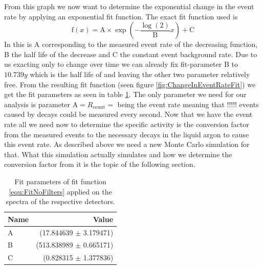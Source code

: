 \documentclass[encoding=utf8,british]{tumphthesis}
\begin{document}
From this graph we now want to determine the exponential change in the event rate by applying an exponential fit function.
The exact fit function used is
\begin{equation}
\mathrm{f}(x) = \mathrm{A}\times\exp\left(-\frac{\log(2)}{\mathrm{B}} x \right) + \mathrm{C}
\label{equ:FitFilters}
\end{equation}
In this is A corresponding to the measured \Kr event rate of the decreasing function, B the half life of the decrease and C the constant event background rate.
Due to us exacting only \Kr to change over time we can already fix fit-parameter B to \(10.739\unit{y}\) which is the half life of \Kr and leaving the other two parameter relatively free.
From the resulting fit function (seen figure \ref{fig:ChangeInEventRateFit}) we get the fit parameters as seen in table \ref{tab:FitParZeit}.
The only parameter we need for our analysis is parameter \(\mathrm{A} = R_{\mathrm{count}} = \) being the \Kr event rate meaning that !!!!! events caused by \Kr decays could be measured every second.
Now that we have the \Kr event rate all we need now to determine the specific activity is the conversion factor from the measured events to the necessary \Kr decays in the liquid argon to cause this \Kr event rate.
As described above we need a new Monte Carlo simulation for that.
What this simulation actually simulates and how we determine the conversion factor from it is the topic of the following section.


\begin{table}[t!]
	\centering
	\begin{tabular}{|l|r|}
		\hline
		Name	& Value  \\ 
		\hline
		A  &	(17.844639 \(\pm\)	3.179471)\\	
		\hline
		B  &	(513.838989 \(\pm\)	0.665171)\\	
		\hline
		C  &	(0.828315 \(\pm\)	1.377836)\\
		\hline
	\end{tabular}
	\caption{Fit parameters of fit function \ref{equ:FitNoFilters} applied on the spectra of the respective detectors.}
    \label{tab:FitParZeit}
\end{table}
\end{document}
